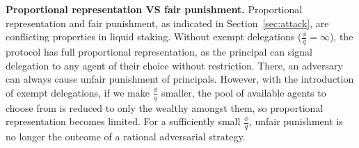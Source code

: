 
\noindent
\textbf{Proportional representation VS fair punishment.}
Proportional representation and fair punishment, as indicated in
Section~\ref{sec:attack}, are conflicting properties in liquid
staking. Without exempt delegations ($\frac{\phi}{q} = \infty$),
the protocol has full proportional representation, as the principal can
signal delegation to any agent of their choice without restriction. There,
an adversary can always cause unfair punishment of principals.
However, with the introduction of exempt delegations, if we make
$\frac{\phi}{q}$ smaller, the pool of available agents to choose from is reduced to
only the wealthy amongst them, so proportional representation
becomes limited. For a sufficiently small $\frac{\phi}{q}$,
unfair punishment is no longer the outcome of a rational adversarial strategy.

%
%

